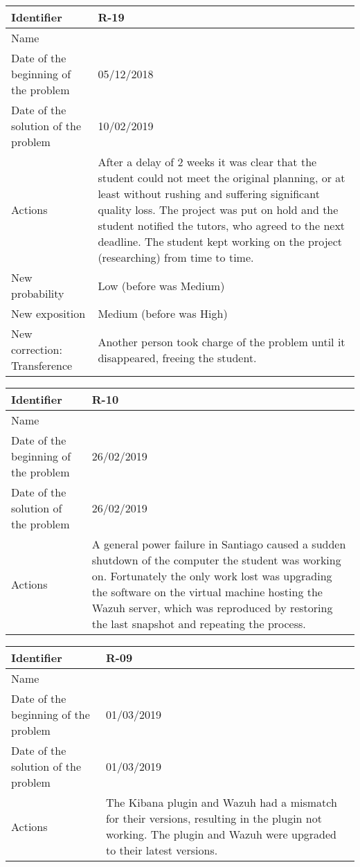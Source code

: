 \begin{table}[H]
	\begin{tabularx}{\textwidth}{|l|X|}
		\hline
		\rowcolor{gray!30}
		Identifier & \textbf{R-19} \\ \hline
		Name & \Rdiecinueve \\ \hline
		Date of the beginning of the problem & 05/12/2018 \\ \hline
		Date of the solution of the problem & 10/02/2019 \\ \hline
		Actions & After a delay of 2 weeks it was clear that the student could not meet the original planning, or at least without rushing and suffering significant quality loss. \linej
			The project was put on hold and the student notified the tutors, who agreed to the next deadline. \linej
			The student kept working on the project (researching) from time to time. \\ \hline
		New probability & Low (before was Medium) \\ \hline
		New exposition & Medium (before was High) \\ \hline
		New correction: Transference &
			Another person took charge of the problem until it disappeared, freeing the student.
		\\ \hline
	\end{tabularx}
\end{table}
\begin{table}[H]
	\begin{tabularx}{\textwidth}{|l|X|}
		\hline
		\rowcolor{gray!30}
		Identifier & \textbf{R-10} \\ \hline
		Name & \Rdiez \\ \hline
		Date of the beginning of the problem & 26/02/2019 \\ \hline
		Date of the solution of the problem & 26/02/2019 \\ \hline
		Actions & A general power failure in Santiago caused a sudden shutdown of the computer the student was working on. \linej
		Fortunately the only work lost was upgrading the software on the virtual machine hosting the Wazuh server, which was reproduced by restoring the last snapshot and repeating the process.\\ \hline
	\end{tabularx}
\end{table}
\begin{table}[H]
	\begin{tabularx}{\textwidth}{|l|X|}
		\hline
		\rowcolor{gray!30}
		Identifier & \textbf{R-09} \\ \hline
		Name & \Rnueve \\ \hline
		Date of the beginning of the problem & 01/03/2019 \\ \hline
		Date of the solution of the problem & 01/03/2019 \\ \hline
		Actions & The Kibana plugin and Wazuh had a mismatch for their versions, resulting in the plugin not working. \linej
		The plugin and Wazuh were upgraded to their latest versions. \\ \hline
	\end{tabularx}
\end{table}
